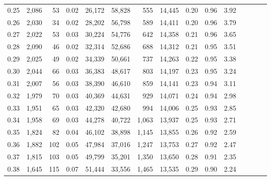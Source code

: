 \begin{tabular}{rrrcrrrrrrrrrrr}
0.25 &  2,086 &   53 &                                       0.02 &  26,172 &  58,828 &     555 &  14,445 &  0.20 &  0.96 &                         3.92 \\
0.26 &  2,030 &   34 &                                       0.02 &  28,202 &  56,798 &     589 &  14,411 &  0.20 &  0.96 &                         3.79 \\
0.27 &  2,022 &   53 &                                       0.03 &  30,224 &  54,776 &     642 &  14,358 &  0.21 &  0.96 &                         3.65 \\
0.28 &  2,090 &   46 &                                       0.02 &  32,314 &  52,686 &     688 &  14,312 &  0.21 &  0.95 &                         3.51 \\
0.29 &  2,025 &   49 &                                       0.02 &  34,339 &  50,661 &     737 &  14,263 &  0.22 &  0.95 &                         3.38 \\
0.30 &  2,044 &   66 &                                       0.03 &  36,383 &  48,617 &     803 &  14,197 &  0.23 &  0.95 &                         3.24 \\
0.31 &  2,007 &   56 &                                       0.03 &  38,390 &  46,610 &     859 &  14,141 &  0.23 &  0.94 &                         3.11 \\
0.32 &  1,979 &   70 &                                       0.03 &  40,369 &  44,631 &     929 &  14,071 &  0.24 &  0.94 &                         2.98 \\
0.33 &  1,951 &   65 &                                       0.03 &  42,320 &  42,680 &     994 &  14,006 &  0.25 &  0.93 &                         2.85 \\
0.34 &  1,958 &   69 &                                       0.03 &  44,278 &  40,722 &   1,063 &  13,937 &  0.25 &  0.93 &                         2.71 \\
0.35 &  1,824 &   82 &                                       0.04 &  46,102 &  38,898 &   1,145 &  13,855 &  0.26 &  0.92 &                         2.59 \\
0.36 &  1,882 &  102 &                                       0.05 &  47,984 &  37,016 &   1,247 &  13,753 &  0.27 &  0.92 &                         2.47 \\
0.37 &  1,815 &  103 &                                       0.05 &  49,799 &  35,201 &   1,350 &  13,650 &  0.28 &  0.91 &                         2.35 \\
0.38 &  1,645 &  115 &                                       0.07 &  51,444 &  33,556 &   1,465 &  13,535 &  0.29 &  0.90 &                         2.24 \\

\end{tabular}
